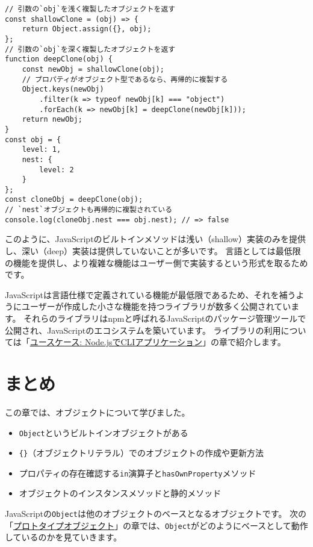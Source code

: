 \begin{lstlisting}
// 引数の`obj`を浅く複製したオブジェクトを返す
const shallowClone = (obj) => {
    return Object.assign({}, obj);
};
// 引数の`obj`を深く複製したオブジェクトを返す
function deepClone(obj) {
    const newObj = shallowClone(obj);
    // プロパティがオブジェクト型であるなら、再帰的に複製する
    Object.keys(newObj)
        .filter(k => typeof newObj[k] === "object")
        .forEach(k => newObj[k] = deepClone(newObj[k]));
    return newObj;
}
const obj = { 
    level: 1,
    nest: {
        level: 2
    }
};
const cloneObj = deepClone(obj);
// `nest`オブジェクトも再帰的に複製されている
console.log(cloneObj.nest === obj.nest); // => false
\end{lstlisting}

このように、JavaScriptのビルトインメソッドは浅い（shallow）実装のみを提供し、深い（deep）実装は提供していないことが多いです。
言語としては最低限の機能を提供し、より複雑な機能はユーザー側で実装するという形式を取るためです。

JavaScriptは言語仕様で定義されている機能が最低限であるため、それを補うようにユーザーが作成した小さな機能を持つライブラリが数多く公開されています。
それらのライブラリはnpmと呼ばれるJavaScriptのパッケージ管理ツールで公開され、JavaScriptのエコシステムを築いています。
ライブラリの利用については「\href{../../use-case/nodecli/README.md}{ユースケース:
Node.jsでCLIアプリケーション}」の章で紹介します。

\hypertarget{conclusion}{%
\section{まとめ}\label{conclusion}}

この章では、オブジェクトについて学びました。

\begin{itemize}
\item
  \texttt{Object}というビルトインオブジェクトがある
\item
  \texttt{\{\}}（オブジェクトリテラル）でのオブジェクトの作成や更新方法
\item
  プロパティの存在確認する\texttt{in}演算子と\texttt{hasOwnProperty}メソッド
\item
  オブジェクトのインスタンスメソッドと静的メソッド
\end{itemize}

JavaScriptの\texttt{Object}は他のオブジェクトのベースとなるオブジェクトです。
次の「\href{../prototype-object/README.md}{プロトタイプオブジェクト}」の章では、\texttt{Object}がどのようにベースとして動作しているのかを見ていきます。
